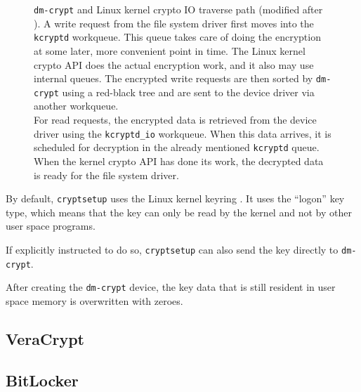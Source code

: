 \begin{figure}[htb!]
	\caption[
		dm-crypt and Linux kernel crypto IO traverse path
	]{
		\texttt{dm-crypt} and Linux kernel crypto IO traverse path (modified after \cite{Korchagin2020}). A write request from the file system driver first moves into the \texttt{kcryptd} workqueue. This queue takes care of doing the encryption at some later, more convenient point in time\footnotemark. The Linux kernel crypto API does the actual encryption work, and it also may use internal queues. The encrypted write requests are then sorted by \texttt{dm-crypt} using a red-black tree and are sent to the device driver via another workqueue. \\
		For read requests, the encrypted data is retrieved from the device driver using the \texttt{kcryptd\_io} workqueue. When this data arrives, it is scheduled for decryption in the already mentioned \texttt{kcryptd} queue. When the kernel crypto API has done its work, the decrypted data is ready for the file system driver.
	}
	\label{fig:otherapproaches.linux.dmcrypt}
\end{figure}


By default, \texttt{cryptsetup} uses the Linux kernel keyring . It uses the ``logon'' key type, which means that the key can only be read by the kernel and not by other user space programs.

If explicitly instructed to do so, \texttt{cryptsetup} can also send the key directly to \texttt{dm-crypt}.

After creating the \texttt{dm-crypt} device, the key data that is still resident in user space memory is overwritten with zeroes.

\subsection{VeraCrypt}
\label{chap:otherapproaches.veracrypt}

\subsection{BitLocker}
\label{chap:otherapproaches.bitlocker}

